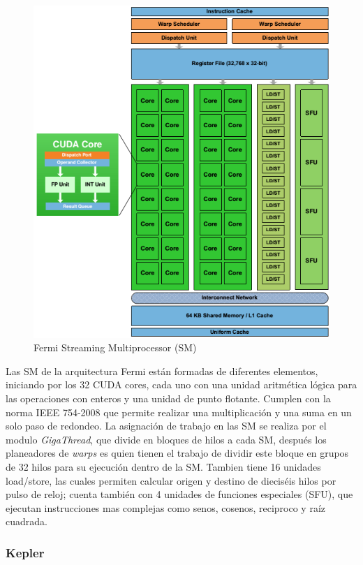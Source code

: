 \begin{figure}[h]
			\centering
				\includegraphics[scale=0.6]{img/fermiSM.png}
			\caption{Fermi Streaming Multiprocessor (SM)}
\end{figure}

Las SM de la arquitectura Fermi están formadas de diferentes elementos, iniciando por los 32 CUDA cores, cada uno con una unidad aritmética lógica para las operaciones con enteros y una unidad de punto flotante. Cumplen con la norma IEEE 754-2008 que permite realizar una multiplicación y una suma en un solo paso de redondeo. La asignación de trabajo en las SM se realiza por el modulo \textit{GigaThread}, que divide en bloques de hilos a cada SM, después los planeadores de \textit{warps} es quien tienen el trabajo de dividir este bloque en grupos de 32 hilos para su ejecución dentro de la SM. Tambien tiene 16 unidades load/store, las cuales permiten calcular origen y destino de dieciséis hilos por pulso de reloj; cuenta también con 4 unidades de funciones especiales (SFU), que ejecutan instrucciones mas complejas como senos, cosenos, reciproco y raíz cuadrada. 

\subsubsection{Kepler}

